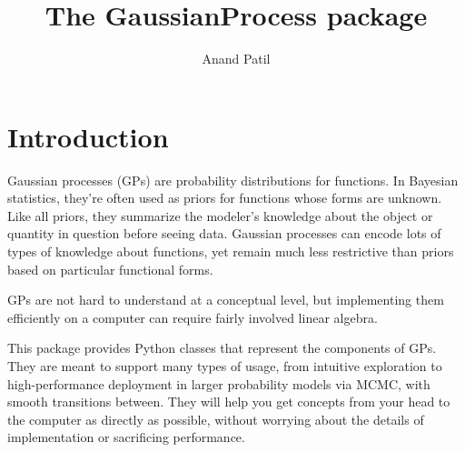 \documentclass{manual}
\begin{document}
\title{The GaussianProcess package}
\author{Anand Patil}
\maketitle
\tableofcontents

\chapter{Introduction}\label{cha:introduction} %

Gaussian processes (GPs) are probability distributions for functions. In Bayesian statistics, they're often used as priors for functions whose forms are unknown. Like all priors, they summarize the modeler's knowledge about the object or quantity in question before seeing data. Gaussian processes can encode lots of types of knowledge about functions, yet remain much less restrictive than priors based on particular functional forms.

GPs are not hard to understand at a conceptual level, but implementing them efficiently on a computer can require fairly involved linear algebra.

This package provides Python classes that represent the components of GPs. They are meant to support many types of usage, from intuitive exploration to high-performance deployment in larger probability models via MCMC, with smooth transitions between. They will help you get concepts from your head to the computer as directly as possible, without worrying about the details of implementation or sacrificing performance.
\end{document}
